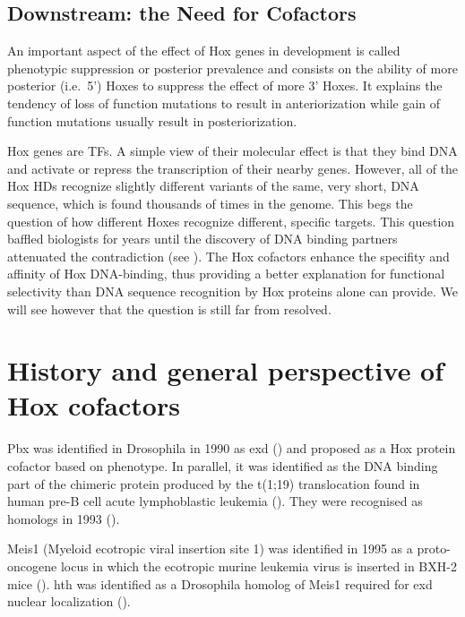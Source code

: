 

\subsection{Downstream: the Need for Cofactors}

An important aspect of the effect of Hox genes in development is called phenotypic suppression \parencite{Gonzalez-Reyes1990} or posterior prevalence \parencite{Lufkin1991} and consists on the ability of more posterior (i.e.\ 5') Hoxes to suppress the effect of more 3' Hoxes. It explains the tendency of loss of function mutations to result in anteriorization while gain of function mutations usually result in posteriorization.

Hox genes are \acp{TF}. A simple view of their molecular effect is that they bind DNA and activate or repress the transcription of their nearby genes. However, all of the Hox \acp{HD} recognize slightly different variants of the same, very short, DNA sequence, which is found thousands of times in the genome. This begs the question of how different Hoxes recognize different, specific targets. This question baffled biologists for years until the discovery of DNA binding partners attenuated the contradiction (see \cite{Mann1996}). The Hox cofactors enhance the specifity and affinity of Hox DNA-binding, thus providing a better explanation for functional selectivity than DNA sequence recognition by Hox proteins alone can provide. We will see however that the question is still far from resolved. 


\section{History and general perspective of Hox cofactors}

Pbx was identified in Drosophila in 1990 as \ac{exd} (\cite{Peifer1990}) and proposed as a Hox protein cofactor based on phenotype. In parallel, it was identified as the DNA binding part of the chimeric protein produced by the t(1;19) translocation found in human pre-B cell acute lymphoblastic leukemia (\cite{Kamps1990}). They were recognised as homologs in 1993 (\cite{Rauskolb1993}).

Meis1 (Myeloid ecotropic viral insertion site 1) was identified in 1995 as a proto-oncogene locus in which the ecotropic murine leukemia virus is inserted in BXH-2 mice (\cite{Moskow1995}). \ac{hth} was identified as a Drosophila homolog of Meis1 required for \ac{exd} nuclear localization (\cite{Rauskolb1995, Rieckhof1997}).

